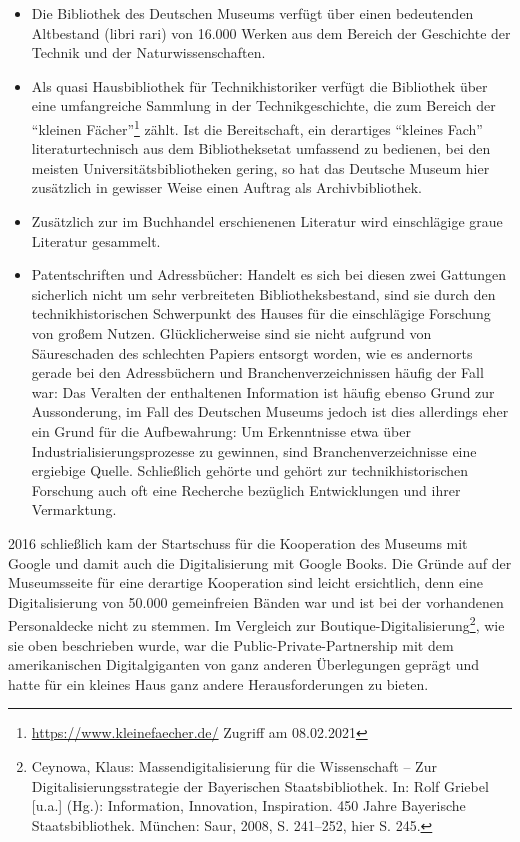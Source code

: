 \documentclass[a4paper,
fontsize=11pt,
oneside,
numbers=noperiodatend,
parskip=half-,
bibliography=totoc,
final
]{scrartcl}
\begin{document}
\begin{itemize}
\item
  Die Bibliothek des Deutschen Museums verfügt über einen bedeutenden
   Altbestand (libri rari) von 16.000 Werken aus dem
  Bereich der  Geschichte der Technik und der
  Naturwissenschaften.
\item
  Als quasi Hausbibliothek für Technikhistoriker verfügt die
   Bibliothek über eine umfangreiche Sammlung in der
   Technikgeschichte, die zum Bereich der \enquote{kleinen
  Fächer}\footnote{\url{https://www.kleinefaecher.de/} Zugriff am
    08.02.2021}  zählt. Ist die Bereitschaft, ein
  derartiges \enquote{kleines Fach}  literaturtechnisch
  aus dem Bibliotheksetat umfassend zu bedienen,  bei den
  meisten Universitätsbibliotheken gering, so hat das 
  Deutsche Museum hier zusätzlich in gewisser Weise einen Auftrag
   als Archivbibliothek.
\item
  Zusätzlich zur im Buchhandel erschienenen Literatur wird
   einschlägige graue Literatur gesammelt.
\item
  Patentschriften und Adressbücher: Handelt es sich bei diesen zwei
   Gattungen sicherlich nicht um sehr verbreiteten
   Bibliotheksbestand, sind sie durch den
  technikhistorischen  \linebreak Schwerpunkt des Hauses für die
  einschlägige Forschung von großem  Nutzen.
  Glücklicherweise sind sie nicht aufgrund von Säureschaden
   des schlechten Papiers entsorgt worden, wie es
  andernorts gerade  bei den Adressbüchern und
  Branchenverzeichnissen häufig der Fall  war: Das
  Veralten der enthaltenen Information ist häufig ebenso 
  Grund zur Aussonderung, im Fall des Deutschen Museums jedoch ist
   dies allerdings eher ein Grund für die Aufbewahrung: Um
   Erkenntnisse etwa über Industrialisierungsprozesse zu
  gewinnen,  sind Branchenverzeichnisse eine ergiebige
  Quelle. Schließlich  gehörte und gehört zur
  technikhistorischen Forschung auch oft eine  Recherche
  bezüglich Entwicklungen und ihrer Vermarktung.
\end{itemize}

2016 schließlich kam der Startschuss für die Kooperation des Museums mit
Google und damit auch die Digitalisierung mit Google Books. Die Gründe
auf der Museumsseite für eine derartige Kooperation sind leicht
ersichtlich, denn eine Digitalisierung von 50.000 gemeinfreien Bänden
war und ist bei der vorhandenen Personaldecke nicht zu stemmen. Im
Vergleich zur Boutique-Digitalisierung\footnote{Ceynowa, Klaus:
  Massendigitalisierung für die Wissenschaft -- Zur
  Digitalisierungsstrategie der Bayerischen Staatsbibliothek. In: Rolf
  Griebel {[}u.a.{]} (Hg.): Information, Innovation, Inspiration. 450
  Jahre Bayerische Staatsbibliothek. München: Saur, 2008, S. 241--252,
  hier S. 245.}, wie sie oben beschrieben wurde, war die
Public-Private-Partnership mit dem amerikanischen Digitalgiganten von
ganz anderen Überlegungen geprägt und hatte für ein kleines Haus ganz
andere Herausforderungen zu bieten.
\end{document}
